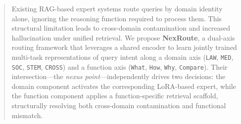 \documentclass[a4paper,fleql]{cas-sc}
\begin{document}
\begin{abstract}
Existing RAG-based expert systems route queries by domain identity alone, ignoring the reasoning function required to process them. This structural limitation leads to cross-domain contamination and increased hallucination under unified retrieval. We propose \textbf{NexRoute}, a dual-axis routing framework that leverages a shared encoder to learn jointly trained multi-task representations of query intent along a domain axis (\texttt{LAW}, \texttt{MED}, \texttt{SOC}, \texttt{STEM}, \texttt{CROSS}) and a function axis (\texttt{What}, \texttt{How}, \texttt{Why}, \texttt{Compare}). Their intersection---the \textit{nexus point}---independently drives two decisions: the domain component activates the corresponding LoRA-based expert, while the function component applies a function-specific retrieval scaffold, structurally resolving both cross-domain contamination and functional mismatch.


\end{abstract}
\end{document}
